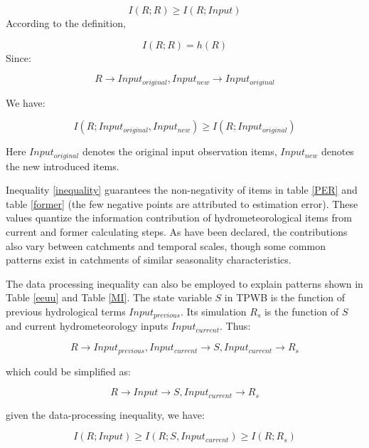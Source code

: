 \documentclass[review]{elsarticle}
\begin{document}
\begin{equation}
\label{a}
I(R;R) \geq I(R;Input)
\end{equation}
According to the definition, 

\begin{equation}
\label{a}
I(R;R)=h(R)
\end{equation}
\fi
Since:

\begin{equation}
R \rightarrow Input_{original},Input_{new} \rightarrow Input_{original}
\end{equation} 

We have:

\begin{equation}
\label{inequality}
I(R;Input_{original},Input_{new}) \geq I(R;Input_{original})
\end{equation}

Here $Input_{original}$ denotes the original input observation items, $Input_{new}$ denotes the new introduced items.  

Inequality \ref{inequality} guarantees the non-negativity of items in table \ref{PER} and table \ref{former} (the few negative points are attributed to estimation error).  
These values quantize the information contribution of  hydrometeorological items from current and former calculating steps. As have been declared, the contributions also vary between catchments and temporal scales, though some common patterns exist in catchments of similar seasonality characteristics.

The data processing inequality can also be employed to explain patterns shown in Table \ref{eeuu} and Table \ref{MI}. The state variable $S$ in TPWB is the function of previous hydrological terms $Input_{previous}$. Its simulation $R_s$ is the function of $S$ and current hydrometeorology inputs $Input_{current}$. Thus:

\begin{equation}
R \rightarrow Input_{previous},Input_{current} \rightarrow S,Input_{current} \rightarrow R_s
\end{equation}

which could be simplified  as:

 \begin{equation}
R \rightarrow Input \rightarrow S,Input_{current} \rightarrow R_s
\end{equation}

given the data-processing inequality, we have:

\begin{equation}
\label{ie2}
I(R;Input)\geq I(R;S,Input_{current}) \geq I(R;R_s)
\end{equation}
\end{document}
